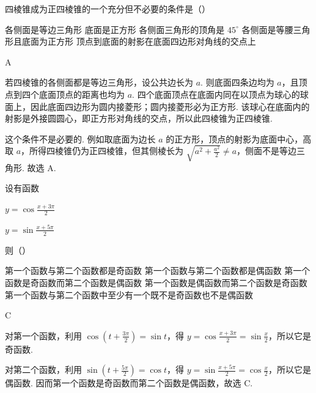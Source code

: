 \begin{problem}

四棱锥成为正四棱锥的一个充分但不必要的条件是（\quad）

\choicesfive
    {各侧面是等边三角形}
    {底面是正方形}
    {各侧面三角形的顶角是 \(45^{\circ} \)}
    {各侧面是等腰三角形且底面为正方形}
    {顶点到底面的射影在底面四边形对角线的交点上}
\end{problem}

\begin{answer}
A
\end{answer}

\begin{solution}
若四棱锥的各侧面都是等边三角形，设公共边长为 \(a\). 则底面四条边均为 \(a\)，且顶点到四个底面顶点的距离也均为 \(a\). 四个底面顶点在底面内同在以顶点为球心的球面上，因此底面四边形为圆内接菱形；圆内接菱形必为正方形. 该球心在底面内的射影是外接圆圆心，即正方形对角线的交点，所以此四棱锥为正四棱锥.

这个条件不是必要的. 例如取底面为边长 \(a\) 的正方形，顶点的射影为底面中心，高取 \(a\)，所得四棱锥仍为正四棱锥，但其侧棱长为 \(\sqrt{a^2+\frac{a^2}{2}}\ne a\)，侧面不是等边三角形. 故选 A.
\end{solution}

\begin{problem}

设有函数

\begin{circlelist}
\item \(y = \cos \frac{x + 3\pi}{2}\)
\item \(y = \sin \frac{x + 5\pi}{2}\)
\end{circlelist}

则（\quad）

\choicesfive
    {第一个函数与第二个函数都是奇函数}
    {第一个函数与第二个函数都是偶函数}
    {第一个函数是奇函数而第二个函数是偶函数}
    {第一个函数是偶函数而第二个函数是奇函数}
    {第一个函数与第二个函数中至少有一个既不是奇函数也不是偶函数}
\end{problem}

\begin{answer}
C
\end{answer}

\begin{solution}
对第一个函数，利用 \(\cos(t+\frac{3\pi}{2})=\sin t\)，得
\(y=\cos\frac{x+3\pi}{2}=\sin\frac{x}{2}\)，所以它是奇函数.

对第二个函数，利用 \(\sin(t+\frac{5\pi}{2})=\cos t\)，得
\(y=\sin\frac{x+5\pi}{2}=\cos\frac{x}{2}\)，所以它是偶函数. 因而第一个函数是奇函数而第二个函数是偶函数，故选 C.
\end{solution}

